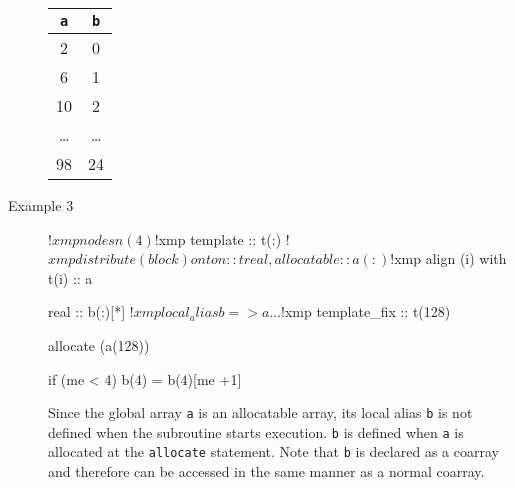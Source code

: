 \begin{description}
\begin{center}
\begin{tabular}{|c|c|}\hline
{\tt a}      & {\tt b} \\ \hline\hline
2            & 0       \\ \hline
6            & 1       \\ \hline
10           & 2       \\ \hline
\dots        & \dots   \\ \hline
98           & 24      \\ \hline
\end{tabular}
\end{center}

\item[Example 3]
\hspace{\hsize}
\begin{XFexample}
!$xmp nodes n(4)
!$xmp template :: t(:)
!$xmp distribute (block) onto n :: t

      real, allocatable :: a(:)
!$xmp align (i) with t(i) :: a

      real :: b(:)[*]
!$xmp local_alias b => a

      …

!$xmp template_fix :: t(128)

      allocate (a(128))

      if (me < 4) b(4) = b(4)[me +1]
\end{XFexample}

Since the global array {\tt a} is an allocatable array, its local alias
{\tt b} is not defined when the subroutine starts execution. {\tt b} is
defined when {\tt a} is allocated at the {\tt allocate}
statement. Note that {\tt b} is declared as a coarray and therefore can be
accessed in the same manner as a normal coarray.

\end{description}


